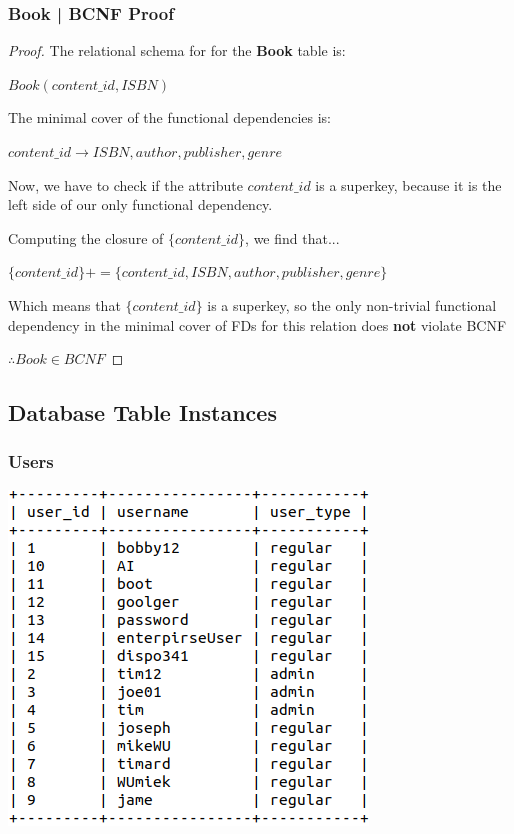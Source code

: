 \documentclass[letter, 12pt, titlepage]{article}
\begin{document}
\subsubsection{Book | BCNF Proof }
\begin{proof}


	The relational schema for for the \textbf{Book} table is:


	$Book(content\_id, ISBN)$

	The minimal cover of the functional dependencies is:

	$ content\_id \rightarrow ISBN, author, publisher, genre $

	Now, we have to check if the attribute $content\_id$ is a superkey, because it is the left side of our only functional dependency.

	Computing the closure of $\{content\_id\}$, we find that...

	$\{content\_id\}+ = \{content\_id, ISBN, author, publisher, genre\} $

	Which means that $\{content\_id\}$ is a superkey, so the only non-trivial functional dependency in the minimal cover of FDs for this relation does \textbf{not} violate BCNF

	$\therefore Book \in BCNF $

\end{proof}


\subsection{Database Table Instances}
\subsubsection{Users}
\includegraphics[scale=.5]{users.png}
\end{document}
